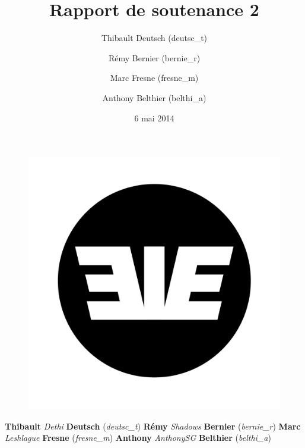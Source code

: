 \documentclass[11pt]{report}
\title{Rapport de soutenance 2}
\author{Thibault Deutsch (deutsc\_t) \and Rémy Bernier (bernie\_r) \and Marc Fresne (fresne\_m) \and Anthony Belthier (belthi\_a)}
\date{6 mai 2014}
\begin{document}
\renewcommand{\labelitemi}{$\bullet$}

\thispagestyle{empty}
\begin{center}
{}
\par
\vspace*{0.5cm}
{}
\par
{\fontsize{15}{18}{{\textbf{\today}}}}
\end{center}

\vspace*{0.5cm}
\begin{figure}[htbp]
   \begin{center}
      \includegraphics[scale = 0.05]{eie.png}
   \end{center}
\end{figure}

\vspace*{0.5cm}
\par
\begin{center}
\fontsize{16}{20}
\textbf{Thibault }
\emph{Dethi }
\textbf{Deutsch}
(\emph{deutsc\_t})
\newline
\textbf{Rémy }
\emph{Shadows }
\textbf{Bernier}
(\emph{bernie\_r})
\newline
\textbf{Marc }
\emph{Leshlague }
\textbf{Fresne}
(\emph{fresne\_m})
\newline
\textbf{Anthony }
\emph{AnthonySG }
\textbf{Belthier}
(\emph{belthi\_a})
\newline
\end{center}
\end{document}
